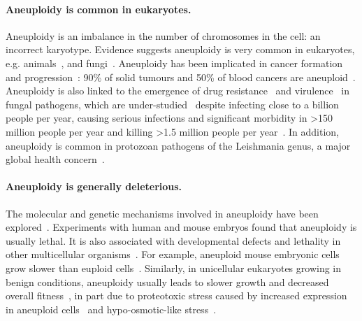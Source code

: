\documentclass[12pt]{extarticle}
\begin{document}
\paragraph*{Aneuploidy is common in eukaryotes.}
Aneuploidy is an imbalance in the number of chromosomes in the cell: an incorrect karyotype.
Evidence suggests aneuploidy is very common in eukaryotes, e.g. animals~\citep{Santaguida2015review, Naylor2016, Bakhoum2017}, and fungi~\citep{Pavelka2010, Zhu2016, Robbins2017, Todd2017}.
Aneuploidy has been implicated in cancer formation and progression~\citep{Boveri2008, Schvartzman2010}: 
90\% of solid tumours and 50\% of blood cancers are aneuploid~\citep{Santaguida2015review}.
Aneuploidy is also linked to the emergence of drug resistance~\citep{Selmecki2009} and virulence~\citep{Moller2018} in fungal pathogens, which are under-studied~\citep{Rodrigues2018} despite infecting close to a billion people per year, causing serious infections and significant morbidity in >150 million people per year and killing >1.5 million people per year~\citep{Selmecki2009, Rodrigues2018}.
In addition, aneuploidy is common in protozoan pathogens of the Leishmania genus, a major global health concern~\citep{Mannaert2012}.

\paragraph*{Aneuploidy is generally deleterious.}
The molecular and genetic mechanisms involved in aneuploidy have been explored~\citep{Musacchio2007, Sheltzer2011, Chen2012b, Rancati2013, Gerstein2015, Shor2015}.
Experiments with human and mouse embryos found that aneuploidy is usually lethal.
It is also associated with developmental defects and lethality in other multicellular organisms~\citep{Sheltzer2011}. For example, aneuploid mouse embryonic cells grow slower than euploid cells~\citep{Williams2008}.
Similarly, in unicellular eukaryotes growing in benign conditions, aneuploidy usually leads to slower growth and decreased overall fitness~\citep{Niwa2006, Torres2007, Pavelka2010, Sheltzer2011, Kasuga2016}, in part due to proteotoxic stress caused by increased expression in aneuploid cells~\citep{Pavelka2010, Santaguida2015, Zhu2018} and hypo-osmotic-like stress~\citep{Tsai2019}.
\end{document}
